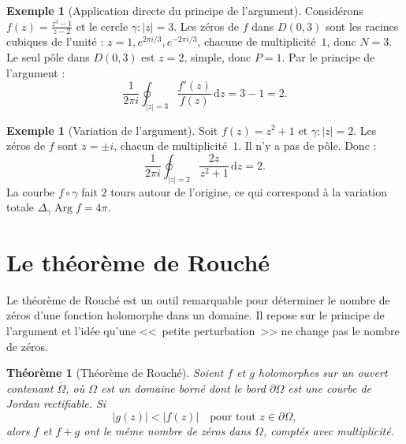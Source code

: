 \documentclass[12pt,a4paper,openany]{book}
\theoremstyle{definition}
\newtheorem{exemple}[definition]{Exemple}
\theoremstyle{plain}
\newtheorem{theoreme}[definition]{Théorème}
\theoremstyle{remark}
\DeclareMathOperator{\Arg}{Arg}
\newcommand{\dd}{\mathrm{d}}
\newcommand{\abs}[1]{\left|#1\right|}
\begin{document}
\begin{exemple}[Application directe du principe de l'argument]\label{ex:principe-argument-direct}
Considérons $f(z) = \frac{z^3 - 1}{z - 2}$ et le cercle $\gamma : \abs{z} = 3$.
Les zéros de $f$ dans $D(0,3)$ sont les racines cubiques de l'unité :
$z = 1, e^{2\pi i/3}, e^{-2\pi i/3}$, chacune de multiplicité~$1$, donc $N = 3$.
Le seul pôle dans $D(0,3)$ est $z = 2$, simple, donc $P = 1$. Par le principe
de l'argument :
\[
  \frac{1}{2\pi i} \oint_{\abs{z}=3} \frac{f'(z)}{f(z)} \, \dd z = 3 - 1 = 2.
\]
\end{exemple}

\begin{exemple}[Variation de l'argument]\label{ex:variation-argument}
Soit $f(z) = z^2 + 1$ et $\gamma : \abs{z} = 2$. Les zéros de $f$ sont
$z = \pm i$, chacun de multiplicité~$1$. Il n'y a pas de pôle. Donc :
\[
  \frac{1}{2\pi i} \oint_{\abs{z}=2} \frac{2z}{z^2+1} \, \dd z = 2.
\]
La courbe $f \circ \gamma$ fait $2$ tours autour de l'origine, ce qui correspond
à la variation totale $\Delta_\gamma \Arg f = 4\pi$.
\end{exemple}

\section{Le théorème de Rouché}\label{sec:rouche}

Le théorème de Rouché est un outil remarquable pour déterminer le nombre de
zéros d'une fonction holomorphe dans un domaine. Il repose sur le principe de
l'argument et l'idée qu'une <<~petite perturbation~>> ne change pas le nombre
de zéros.

\begin{theoreme}[Théorème de Rouché]\label{thm:rouche}
Soient $f$ et $g$ holomorphes sur un ouvert contenant $\overline{\Omega}$, où
$\Omega$ est un domaine borné dont le bord $\partial\Omega$ est une courbe de
Jordan rectifiable. Si
\begin{equation}\label{eq:rouche-condition}
  \abs{g(z)} < \abs{f(z)} \quad \text{pour tout } z \in \partial\Omega,
\end{equation}
alors $f$ et $f + g$ ont le même nombre de zéros dans $\Omega$, comptés avec
multiplicité.
\end{theoreme}
\end{document}

